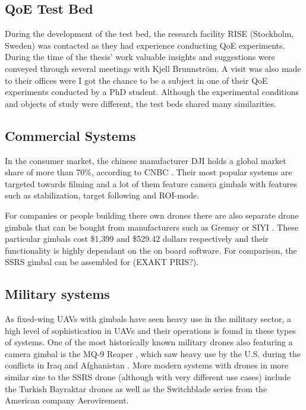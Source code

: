 \documentclass[nofilelist]{cslthse-msc}
\begin{document}
\subsection{QoE Test Bed}
During the development of the test bed, the research facility RISE (Stockholm, Sweden) was contacted as they had experience conducting QoE experiments. During the time of the thesis' work valuable insights and suggestions were conveyed through several meetings with Kjell Brunnström. A visit was also made to their offices were I got the chance to be a subject in one of their QoE experiments conducted by a PhD student. Although the experimental conditions and objects of study were different, the test beds shared many similarities. 

\subsection{Commercial Systems}
In the consumer market, the chinese manufacturer DJI holds a global market share of more than 70\%, according to CNBC \cite{dji}. Their most popular systems are targeted towards filming and a lot of them feature camera gimbals with features such as stabilization, target following and ROI-mode. 

For companies or people building there own drones there are also separate drone gimbals that can be bought from manufacturers such as Gremsy \cite{gremsy} or SIYI \cite{siyi}. These particular gimbals cost \$1,399 and \$529.42 dollars respectively and their functionality is highly dependant on the on board software. For comparison, the SSRS gimbal can be assembled for (EXAKT PRIS?).

\subsection{Military systems}
As fixed-wing UAVs with gimbals have seen heavy use in the military sector, a high level of sophistication in UAVs and their operations is found in these types of systems. One of the most historically known military drones also featuring a camera gimbal is the MQ-9 Reaper \cite{mq9reaper}, which saw heavy use by the U.S. during the conflicts in Iraq and Afghanistan \cite{mq9reaper-wiki}. More modern systems with drones in more similar size to the SSRS drone (although with very different use cases) include the Turkish Bayraktar drones \cite{bayraktar-wiki} as well as the Switchblade series \cite{switchblade} from the American company Aerovirement.
\end{document}
